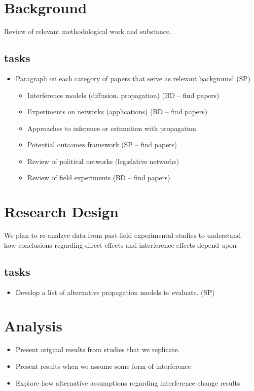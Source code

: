 \documentclass[12pt]{article}
\begin{document}
\section{Background}

Review of relevant methodological work and substance.

\subsection{tasks}
\begin{itemize}
\item Paragraph on each category of papers that serve as relevant background (SP)
\begin{itemize}
\item Interference models (diffusion, propagation) (BD -- find papers)
\item  Experiments on networks (applications) (BD -- find papers)
\item Approaches to inference or estimation with propagation 
\item Potential outcomes framework (SP -- find papers)
\item Review of political networks (legislative networks)
\item Review of field experiments (BD -- find papers)
\end{itemize}
\end{itemize}


\section{Research Design}

We plan to re-analzye data from past field experimental studies to understand how conclusions regarding direct effects and interference effects depend upon 

\subsection{tasks}
\begin{itemize}
\item Develop a list of alternative propagation models to evaluate. (SP)
\end{itemize}


\section{Analysis}

\begin{itemize}

\item Present original results from studies that we replicate.
\item Present results when we assume some form of interference
\item Explore how alternative assumptions regarding interference change results

\end{itemize}
\end{document}
